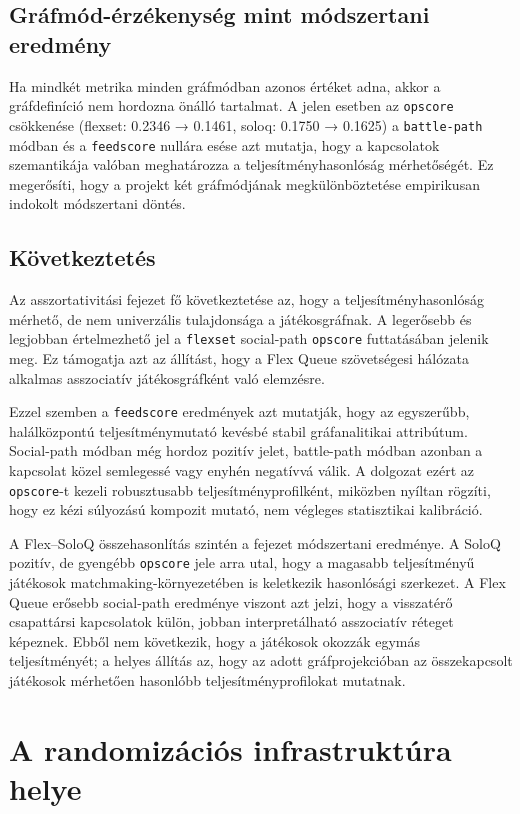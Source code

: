 ﻿\documentclass[a4paper,12pt]{report}
\begin{document}
\subsection{Gráfmód-érzékenység mint módszertani eredmény}

Ha mindkét metrika minden gráfmódban azonos értéket adna, akkor a gráfdefiníció nem hordozna önálló tartalmat. A jelen esetben az \texttt{opscore} csökkenése (flexset: 0.2346 → 0.1461, soloq: 0.1750 → 0.1625) a \texttt{battle-path} módban és a \texttt{feedscore} nullára esése azt mutatja, hogy a kapcsolatok szemantikája valóban meghatározza a teljesítményhasonlóság mérhetőségét. Ez megerősíti, hogy a projekt két gráfmódjának megkülönböztetése empirikusan indokolt módszertani döntés.

\subsection{Következtetés}

Az asszortativitási fejezet fő következtetése az, hogy a teljesítményhasonlóság mérhető, de nem univerzális tulajdonsága a játékosgráfnak. A legerősebb és legjobban értelmezhető jel a \texttt{flexset} social-path \texttt{opscore} futtatásában jelenik meg. Ez támogatja azt az állítást, hogy a Flex Queue szövetségesi hálózata alkalmas asszociatív játékosgráfként való elemzésre.

Ezzel szemben a \texttt{feedscore} eredmények azt mutatják, hogy az egyszerűbb, halálközpontú teljesítménymutató kevésbé stabil gráfanalitikai attribútum. Social-path módban még hordoz pozitív jelet, battle-path módban azonban a kapcsolat közel semlegessé vagy enyhén negatívvá válik. A dolgozat ezért az \texttt{opscore}-t kezeli robusztusabb teljesítményprofilként, miközben nyíltan rögzíti, hogy ez kézi súlyozású kompozit mutató, nem végleges statisztikai kalibráció.

A Flex--SoloQ összehasonlítás szintén a fejezet módszertani eredménye. A SoloQ pozitív, de gyengébb \texttt{opscore} jele arra utal, hogy a magasabb teljesítményű játékosok matchmaking-környezetében is keletkezik hasonlósági szerkezet. A Flex Queue erősebb social-path eredménye viszont azt jelzi, hogy a visszatérő csapattársi kapcsolatok külön, jobban interpretálható asszociatív réteget képeznek. Ebből nem következik, hogy a játékosok okozzák egymás teljesítményét; a helyes állítás az, hogy az adott gráfprojekcióban az összekapcsolt játékosok mérhetően hasonlóbb teljesítményprofilokat mutatnak.

\section{A randomizációs infrastruktúra helye}
\end{document}
